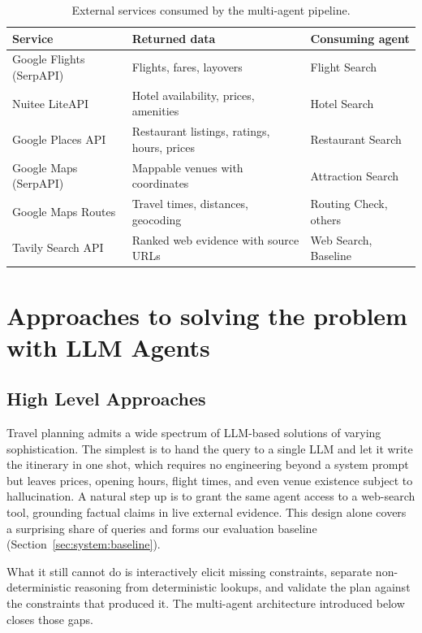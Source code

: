 \documentclass[a4paper,oneside,bibliography=totoc]{scrbook}
\begin{document}
\begin{table}[!htbp]
\centering
\small
\begin{tabularx}{\linewidth}{lXl}
\toprule
Service & Returned data & Consuming agent \\
\midrule
Google Flights (SerpAPI) & Flights, fares, layovers & Flight Search \\
Nuitee LiteAPI & Hotel availability, prices, amenities & Hotel Search \\
Google Places API & Restaurant listings, ratings, hours, prices & Restaurant Search \\
Google Maps (SerpAPI) & Mappable venues with coordinates & Attraction Search \\
Google Maps Routes & Travel times, distances, geocoding & Routing Check, others \\
Tavily Search API & Ranked web evidence with source URLs & Web Search, Baseline \\
\bottomrule
\end{tabularx}
\caption{External services consumed by the multi-agent pipeline.}
\label{tab:apis}
\end{table}


\chapter{Approaches to solving the problem with LLM Agents}
\label{sec:system}


\section{High Level Approaches}
\label{sec:system:approaches}
Travel planning admits a wide spectrum of LLM-based solutions of
varying sophistication. The simplest is to hand the query to a single
LLM and let it write the itinerary in one shot, which requires no
engineering beyond a system prompt but leaves prices, opening hours,
flight times, and even venue existence subject to hallucination. A
natural step up is to grant the same agent access to a web-search tool,
grounding factual claims in live external evidence. This design alone
covers a surprising share of queries and forms our evaluation baseline
(Section~\ref{sec:system:baseline}). 




What it still cannot do is interactively elicit missing constraints,  separate non-deterministic
reasoning from deterministic lookups, and validate the plan against the constraints that produced it. 
The multi-agent architecture introduced below closes those gaps.
\end{document}
